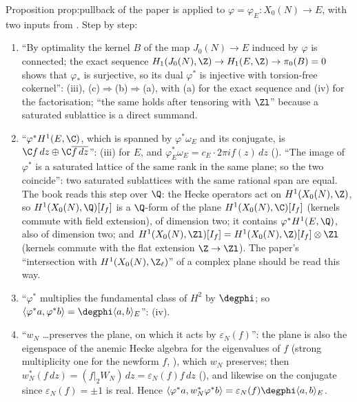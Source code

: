 \begin{paperlink}\label{pl:curves:pullback}
Proposition prop:pullback of the paper is  applied to $\varphi=\varphi_E\colon X_0(N)\to E$, with two inputs from
. Step by step:
\begin{enumerate}[label=(\alph*)]
\item ``By optimality the kernel $B$ of the map $J_0(N)\to E$ induced by $\varphi$ is connected; the exact sequence $H_1(J_0(N),\Z)\to H_1(E,\Z)\to\pi_0(B)=0$ shows that $\varphi_*$ is surjective,
so its dual $\varphi^*$ is injective with torsion-free cokernel'': (iii), (c)$\Rightarrow$(b)$\Rightarrow$(a), with (a) for the exact
sequence and (iv) for the factorisation; ``the same holds after tensoring with $\Zl$'' because a saturated sublattice is a direct summand.
\item ``$\varphi^*H^1(E,\C)$, which is spanned by $\varphi^*\omega_E$ and its conjugate, is $\C f\,dz\oplus\C\overline{f\,dz}$'': (iii) for $E$, and
$\varphi_E^*\omega_E=c_E\cdot2\pi if(z)\,dz$ (). ``The image of $\varphi^*$ is a saturated lattice of the same rank in the same plane; so the two coincide'': two saturated
sublattices with the same rational span are equal. The book reads this step over $\Q$: the Hecke operators act on $H^1(X_0(N),\Z)$, so $H^1(X_0(N),\Q)[I_f]$ is a $\Q$-form of the plane
$H^1(X_0(N),\C)[I_f]$ (kernels commute with field extension), of dimension two; it contains $\varphi^*H^1(E,\Q)$, also of dimension two; and $H^1(X_0(N),\Zl)[I_f]=H^1(X_0(N),\Z)[I_f]\otimes\Zl$
(kernels commute with the flat extension $\Z\to\Zl$). The paper's ``intersection with $H^1(X_0(N),\Z_\ell)$'' of a complex plane should be read this way.
\item ``$\varphi^*$ multiplies the fundamental class of $H^2$ by $\degphi$; so $\langle\varphi^*a,\varphi^*b\rangle=\degphi\langle a,b\rangle_E$'': (iv).
\item ``$w_N$ \dots preserves the plane, on which it acts by $\varepsilon_N(f)$'': the plane is also the eigenspace of the anemic Hecke algebra for the eigenvalues of $f$ (strong multiplicity one
for the newform $f$, ), which $w_N$ preserves; then $w_N^*(f\,dz)=(f|_2W_N)\,dz=\varepsilon_N(f)f\,dz$ (), and likewise on the conjugate since
$\varepsilon_N(f)=\pm1$ is real. Hence $\langle\varphi^*a,w_N^*\varphi^*b\rangle=\varepsilon_N(f)\degphi\langle a,b\rangle_E$.

\end{enumerate}
\end{paperlink}
